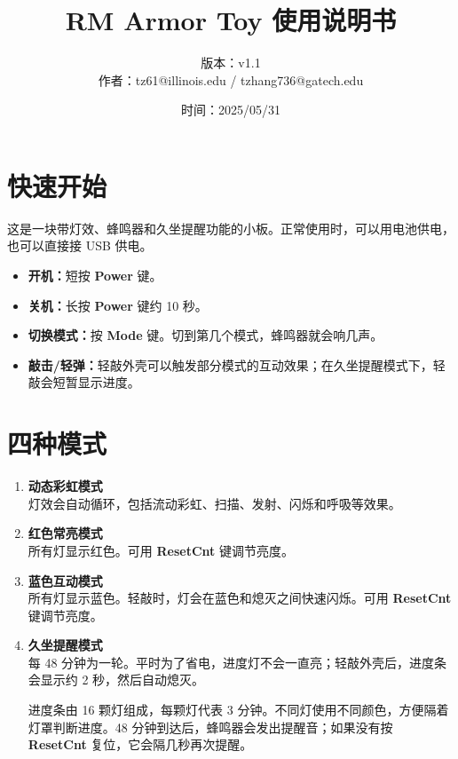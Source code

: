 \documentclass[fontset=fandol,11pt,a4paper]{ctexart}
\title{\textbf{RM Armor Toy 使用说明书}}
\author{版本：v1.1\\作者：tz61@illinois.edu / tzhang736@gatech.edu}
\date{时间：2025/05/31}
\begin{document}
\maketitle

\section*{快速开始}

这是一块带灯效、蜂鸣器和久坐提醒功能的小板。正常使用时，可以用电池供电，也可以直接接 USB 供电。

\begin{itemize}
  \item \textbf{开机：}短按 \textbf{Power} 键。
  \item \textbf{关机：}长按 \textbf{Power} 键约 10 秒。
  \item \textbf{切换模式：}按 \textbf{Mode} 键。切到第几个模式，蜂鸣器就会响几声。
  \item \textbf{敲击/轻弹：}轻敲外壳可以触发部分模式的互动效果；在久坐提醒模式下，轻敲会短暂显示进度。
\end{itemize}

\section*{四种模式}

\begin{enumerate}
  \item \textbf{动态彩虹模式}\\
  灯效会自动循环，包括流动彩虹、扫描、发射、闪烁和呼吸等效果。

  \item \textbf{红色常亮模式}\\
  所有灯显示红色。可用 \textbf{ResetCnt} 键调节亮度。

  \item \textbf{蓝色互动模式}\\
  所有灯显示蓝色。轻敲时，灯会在蓝色和熄灭之间快速闪烁。可用 \textbf{ResetCnt} 键调节亮度。

  \item \textbf{久坐提醒模式}\\
  每 48 分钟为一轮。平时为了省电，进度灯不会一直亮；轻敲外壳后，进度条会显示约 2 秒，然后自动熄灭。

  进度条由 16 颗灯组成，每颗灯代表 3 分钟。不同灯使用不同颜色，方便隔着灯罩判断进度。48 分钟到达后，蜂鸣器会发出提醒音；如果没有按 \textbf{ResetCnt} 复位，它会隔几秒再次提醒。
\end{enumerate}
\end{document}
